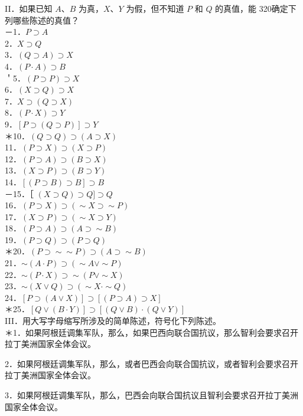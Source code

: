 II．如果已知 $A 、 B$ 为真，$X 、 Y$ 为假，但不知道 $P$ 和 $Q$ 的真值，能 320确定下列哪些陈述的真值？\\
－1．$P \supset A$\\
2．$X \supset Q$\\
3．$(Q \supset A) \supset X$\\
4．$(P \cdot A) \supset B$\\
＇5．$(P \supset P) \supset X$\\
6．$(X \supset Q) \supset X$\\
7．$X \supset(Q \supset X)$\\
8．$(P \cdot X) \supset Y$\\
9．$[P \supset(Q \supset P)] \supset Y$\\
＊10．$(Q \supset Q) \supset(A \supset X)$\\
11．$(P \supset X) \supset(X \supset P)$\\
12．$(P \supset A) \supset(B \supset X)$\\
13．$(X \supset P) \supset(B \supset Y)$\\
14．$[(P \supset B) \supset B] \supset B$\\
－15．［ $(X \supset Q) \supset Q] \supset Q$\\
16．$(P \supset X) \supset(\sim X \supset \sim P)$\\
17．$(X \supset P) \supset(\sim X \supset Y)$\\
18．$(P \supset A) \supset(A \supset \sim B)$\\
19．$(P \supset Q) \supset(P \supset Q)$\\
＊20．$(P \supset \sim \sim P) \supset(A \supset \sim B)$\\
21．$\sim(A \cdot P) \supset(\sim A \vee \sim P)$\\
22．$\sim(P \cdot X) \supset \sim(P \vee \sim X)$\\
23．$\sim(X \vee Q) \supset(\sim X \cdot \sim Q)$\\
24．$[P \supset(A \vee X)] \supset[(P \supset A) \supset X]$\\
＊25．$[Q \vee(B \cdot Y)] \supset[(Q \vee B) \cdot(Q \vee Y)]$\\
III．用大写字母缩写所涉及的简单陈述，符号化下列陈述。\\
＊1．如果阿根廷调集军队，那么，如果巴西向联合国抗议，那么智利会要求召开拉丁美洲国家全体会议。

2．如果阿根廷调集军队，那么，或者巴西会向联合国抗议，或者智利会要求召开拉丁美洲国家全体会议。

3．如果阿根廷调集军队，那么，巴西会向联合国抗议且智利会要求召开拉丁美洲国家全体会议。

